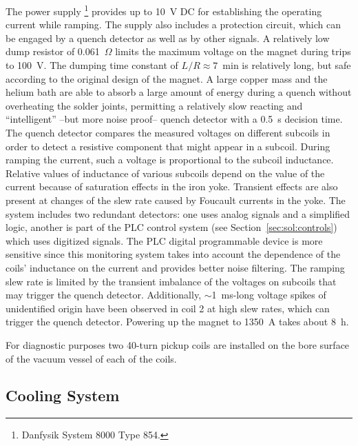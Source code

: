 The power supply%
\footnote{Danfysik System 8000 Type 854.}
provides up to 10~V DC for establishing the operating current while ramping. The supply also
includes a protection circuit, which can be engaged by a quench
detector as well as by other signals.  A relatively low dump resistor
of 0.061~$\Omega$ limits the maximum voltage on the magnet during
trips to 100~V. The dumping time constant of $L/R \approx 7$~min is
relatively long, but safe according to the original design of the
magnet. A large copper mass and the helium bath are able to absorb a
large amount of energy during a quench without overheating the solder
joints, permitting a relatively slow reacting and ``intelligent'' --but more noise proof-- quench detector with a 0.5~s decision
time.  The
quench detector compares the measured voltages on different subcoils
in order to detect a resistive component that might appear in a
subcoil.
During ramping the current, such a voltage is proportional
to the subcoil inductance.  Relative values of inductance of various
subcoils depend on the value of the current because of saturation
effects in the iron yoke. Transient effects are also present at changes
of the slew rate caused by Foucault currents in the yoke.
The system includes two redundant detectors: one uses analog signals
and a simplified logic, another is part of the PLC control system (see
Section~\ref{sec:sol:controls}) which uses digitized signals. The PLC
digital programmable device is more sensitive since this monitoring system takes into
account the dependence of the coils' inductance on the current and
provides better noise filtering.  The ramping slew rate is
limited by the transient imbalance of the voltages on subcoils that
may trigger the quench detector. Additionally, $\sim$1~ms-long voltage
spikes of unidentified origin have been observed in coil 2 at high
slew rates, which can  trigger the quench detector. Powering up the
magnet to 1350~A takes about 8~h.

For diagnostic purposes two 40-turn pickup coils are installed on the bore
surface of the vacuum vessel of each of the coils. 

\subsection[Cooling System]{
   Cooling System
   \label{sec:sol:cryo}
}

